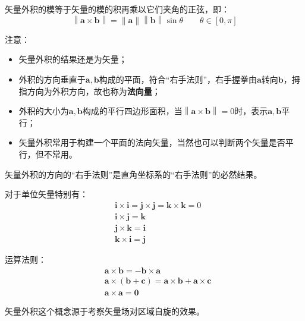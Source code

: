 \begin{theorem}
矢量外积的模等于矢量的模的积再乘以它们夹角的正弦，即：
\[
\left\| \boldsymbol{a}\times \boldsymbol{b} \right\| =\left\| \boldsymbol{a} \right\| \left\| \boldsymbol{b} \right\| \sin \theta \qquad \theta \in \left[ 0,\pi \right]
\]
\end{theorem}

注意：
\begin{itemize}
    \item 矢量外积的结果还是为矢量；
    \item 外积的方向垂直于$\boldsymbol{a},\boldsymbol{b}$构成的平面，符合“右手法则”，右手握拳由$\boldsymbol{a}$转向$\boldsymbol{b}$，拇指方向为外积方向，故也称为{\bf 法向量}；
    \item 外积的大小为$\boldsymbol{a},\boldsymbol{b}$构成的平行四边形面积，当$\left\| \boldsymbol{a}\times \boldsymbol{b} \right\| =0$时，表示$\boldsymbol{a},\boldsymbol{b}$平行；
    \item 矢量外积常用于构建一个平面的法向矢量，当然也可以判断两个矢量是否平行，但不常用。
\end{itemize}

\begin{tcolorbox}
矢量外积的方向的“右手法则”是直角坐标系的“右手法则”的必然结果。
\end{tcolorbox}

对于单位矢量特别有：
\begin{align*}
&\mathbf{i}\times \mathbf{i}=\mathbf{j}\times \mathbf{j}=\mathbf{k}\times \mathbf{k}=0 \\
&\mathbf{i}\times \mathbf{j}=\mathbf{k} \\
&\mathbf{j}\times \mathbf{k}=\mathbf{i} \\
&\mathbf{k}\times \mathbf{i}=\mathbf{j}
\end{align*}

运算法则：
\begin{align*}
&\boldsymbol{a}\times \boldsymbol{b}=-\boldsymbol{b}\times \boldsymbol{a} \\
&\boldsymbol{a}\times \left( \boldsymbol{b}+\boldsymbol{c} \right) =\boldsymbol{a}\times \boldsymbol{b}+\boldsymbol{a}\times \boldsymbol{c} \\
&\boldsymbol{a}\times \boldsymbol{a}=\mathbf{0}
\end{align*}

\begin{tcolorbox}
矢量外积这个概念源于考察矢量场对区域自旋的效果。
\end{tcolorbox}

